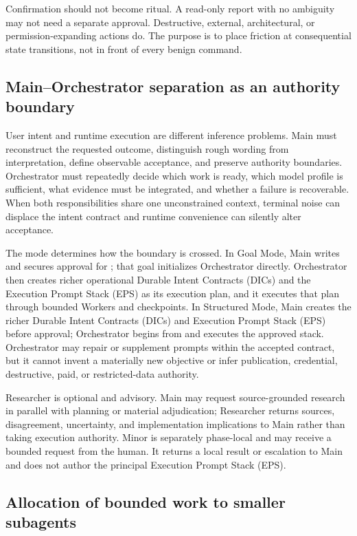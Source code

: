\documentclass[11pt,a4paper]{article}
\newcommand{\code}[1]{\texttt{\detokenize{#1}}}
\begin{document}
Confirmation should not become ritual. A read-only report with no ambiguity may not need a separate approval. Destructive, external, architectural, or permission-expanding actions do. The purpose is to place friction at consequential state transitions, not in front of every benign command.

\subsection{Main--Orchestrator separation as an authority boundary}\label{sec:orchestrator-translation}

User intent and runtime execution are different inference problems. Main must reconstruct the
requested outcome, distinguish rough wording from interpretation, define observable acceptance, and
preserve authority boundaries. Orchestrator must repeatedly decide which work is ready, which model
profile is sufficient, what evidence must be integrated, and whether a failure is recoverable. When
both responsibilities share one unconstrained context, terminal noise can displace the intent
contract and runtime convenience can silently alter acceptance.

The mode determines how the boundary is crossed. In Goal Mode, Main writes and secures approval for
\code{GOAL.md}; that goal initializes Orchestrator directly. Orchestrator then creates richer
operational Durable Intent Contracts (DICs) and the Execution Prompt Stack (EPS) as its execution plan, and it executes that plan through bounded Workers
and checkpoints. In Structured Mode, Main creates the richer Durable Intent Contracts (DICs) and Execution Prompt Stack (EPS) before approval;
Orchestrator begins from \code{prompt_000_orchestrator_init.md} and executes the approved stack.
Orchestrator may repair or supplement prompts within the accepted contract, but it cannot invent a
materially new objective or infer publication, credential, destructive, paid, or restricted-data
authority.

Researcher is optional and advisory. Main may request source-grounded research in parallel with
planning or material adjudication; Researcher returns sources, disagreement, uncertainty, and
implementation implications to Main rather than taking execution authority. Minor is separately
phase-local and may receive a bounded request from the human. It returns a local result or escalation
to Main and does not author the principal Execution Prompt Stack (EPS).

\subsection{Allocation of bounded work to smaller subagents}\label{sec:subagent-allocation}
\end{document}
